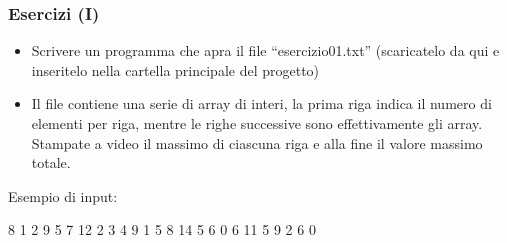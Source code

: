 \begin{frame}[fragile]\frametitle{Esercizi (I)}

  \begin{itemize}
   \item Scrivere un  programma che apra il file  “esercizio01.txt”  (scaricatelo da  qui
   {\footnotesize {}} e  inseritelo nella
   cartella principale del  progetto)
   \item Il  file  contiene una serie di  array  di  interi,  la  prima  riga indica il numero
   di elementi per riga, mentre le  righe successive sono effettivamente gli array.  Stampate
   a video il massimo di ciascuna riga e  alla fine il valore massimo totale.
  \end{itemize}

  \begin{center}
  \begin{minipage}[c]{4cm}
  Esempio di input:
  \begin{JavaCodePlain}[commandchars=\\!|]
  8
  1  2  9  5  7  12  2  3
  4  9  1  5  8  14  5  6
  0  6  11 5  9  2   6  0   
  \end{JavaCodePlain}
  \end{minipage}
  \end{center}
\end{frame}

